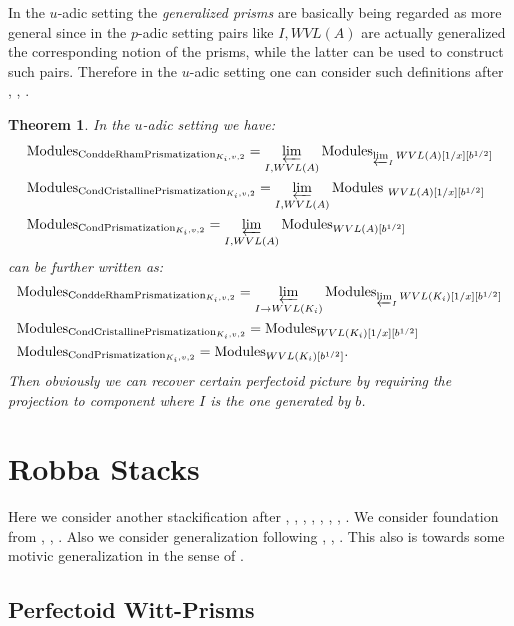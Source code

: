 \documentclass[12pt]{article}
\newtheorem{theorem}{Theorem}
\theoremstyle{definition}
\begin{document}
\indent In the $u$-adic setting the \textit{generalized prisms} are basically being regarded as more general since in the $p$-adic setting pairs like $I,WVL(A)$ are actually generalized the corresponding notion of the prisms, while the latter can be used to construct such pairs. Therefore in the $u$-adic setting one can consider such definitions after \cite{1BS}, \cite{1BL}, \cite{1D}. 

\begin{theorem}
In the $u$-adic setting we have:
\begin{align}
&\mathrm{Modules}_{\mathrm{ConddeRhamPrismatization}_{K_i,v,2}}=\varprojlim_{{I,WVL(A)}} \mathrm{Modules}_{\varprojlim_{I}WVL(A)[1/x][b^{1/2}]}\\
&\mathrm{Modules}_{\mathrm{CondCristallinePrismatization}_{K_i,v,2}}=\varprojlim_{{I,WVL(A)}} \mathrm{Modules}_{\ WVL(A)[1/x][b^{1/2}]}\\
&\mathrm{Modules}_{\mathrm{CondPrismatization}_{K_i,v,2}}=\varprojlim_{{I,WVL(A)}} \mathrm{Modules}_{WVL(A)[b^{1/2}]}
\end{align}
can be further written as:
\begin{align}
&\mathrm{Modules}_{\mathrm{ConddeRhamPrismatization}_{K_i,v,2}}=\varprojlim_{{I\rightarrow WVL(K_i)}} \mathrm{Modules}_{\varprojlim_{I}WVL(K_i)[1/x][b^{1/2}]}\\
&\mathrm{Modules}_{\mathrm{CondCristallinePrismatization}_{K_i,v,2}}=\mathrm{Modules}_{ WVL(K_i)[1/x][b^{1/2}]}\\
&\mathrm{Modules}_{\mathrm{CondPrismatization}_{K_i,v,2}}=\mathrm{Modules}_{WVL(K_i)[b^{1/2}]}.
\end{align}
Then obviously we can recover certain perfectoid picture by requiring the projection to component where $I$ is the one generated by $b$.
\end{theorem}


\newpage
\section{Robba Stacks}

Here we consider another stackification after \cite{1KL}, \cite{1KL1}, \cite{1S1}, \cite{1S2}, \cite{1S3}, \cite{1F1}, \cite{1F2}, \cite{1T1}. We consider foundation from \cite{1CSA}, \cite{1CSB}, \cite{1CS}. Also we consider generalization following  \cite{1BS1}, \cite{1BL1}, \cite{1BL2}. This also is towards some motivic generalization in the sense of \cite{1G}. 

\subsection{Perfectoid Witt-Prisms}
\end{document}
